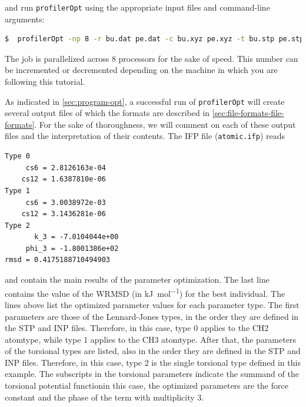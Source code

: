 \documentclass[10pt,a4paper,openany]{memoir}
\numberwithin{equation}{section}
\newcommand{\profileropt}[0]{\texttt{profilerOpt}}
\begin{document}
\noindent
and run \profileropt{} using the appropriate input files and 
command-line arguments:

\begin{lstlisting}[language=bash]
$  profilerOpt -np 8 -r bu.dat pe.dat -c bu.xyz pe.xyz -t bu.stp pe.stp -i run.inp -op atomic
\end{lstlisting}\vspace{2ex}\par

\noindent
The job is parallelized across 8 processors for the sake of speed.
This number can be incremented or decremented depending on the machine
in which you are following this tutorial.

As indicated in \autoref{sec:program-opt}, a successful run of
\profileropt{} will create several output files of which the formats
are described in \autoref{sec:file-formats-file-formats}.
%
For the sake of thoroughness, we will comment on each of these output
files and the interpretation of their contents.
%
The IFP file (\texttt{atomic.ifp}) reads

\begin{lstlisting}[language=gromacs]
Type 0
     cs6 = 2.8126163e-04     
    cs12 = 1.6387810e-06     
Type 1
     cs6 = 3.0038972e-03     
    cs12 = 3.1436281e-06     
Type 2
       k_3 = -7.0104044e+00    
     phi_3 = -1.8001386e+02    
rmsd = 0.4175188710494903
\end{lstlisting}\vspace{2ex}\par

\noindent
and contain the main results of the parameter optimization.  The last
line contains the value of the WRMSD (in \si{\kJ\per\mole}) for the
best individual.  The lines above list the optimized parameter values
for each parameter type.  The first parameters are those of the
Lennard-Jones types, in the order they are defined in the STP and INP
files.  Therefore, in this case, type 0 applies to the CH2 atomtype,
while type 1 applies to the CH3 atomtype.  After that, the parameters
of the torsional types are listed, also in the order they are defined
in the STP and INP files.  Therefore, in this case, type 2 is the
single torsional type defined in this example. The subscripts in the
torsional parameters indicate the summand of the torsional potential
function\textemdash{}in this case, the optimized parameters are the
force constant and the phase of the term with multiplicity 3.
\end{document}
